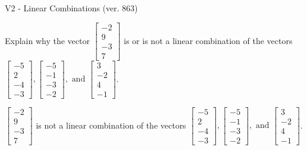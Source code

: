 \begin{exercise}
  \begin{exerciseTitle}V2 - Linear Combinations (ver. 863)\end{exerciseTitle}
  \begin{exerciseStatement}
    Explain why the vector \(\left[\begin{array}{c}
-2 \\
9 \\
-3 \\
7
\end{array}\right]\)  is or is not a linear 
	combination of the vectors \(\left[\begin{array}{c}
-5 \\
2 \\
-4 \\
-3
\end{array}\right] , \left[\begin{array}{c}
-5 \\
-1 \\
-3 \\
-2
\end{array}\right] , \text{ and } \left[\begin{array}{c}
3 \\
-2 \\
4 \\
-1
\end{array}\right]\).
	


  \end{exerciseStatement}
  \begin{exerciseAnswer}
   \(\left[\begin{array}{c}
-2 \\
9 \\
-3 \\
7
\end{array}\right]\) 
  	 is not  
	a linear combination of the vectors \(\left[\begin{array}{c}
-5 \\
2 \\
-4 \\
-3
\end{array}\right] , \left[\begin{array}{c}
-5 \\
-1 \\
-3 \\
-2
\end{array}\right] , \text{ and } \left[\begin{array}{c}
3 \\
-2 \\
4 \\
-1
\end{array}\right]\).

	
  


  \end{exerciseAnswer}
\end{exercise}